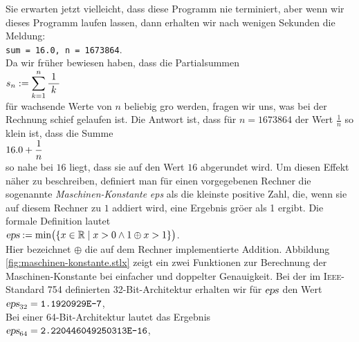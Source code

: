 Sie erwarten jetzt vielleicht, dass diese Programm nie terminiert, aber wenn wir dieses Programm
laufen lassen, dann erhalten wir nach wenigen Sekunden die Meldung:
\\[0.2cm]
\hspace*{1.3cm}
\texttt{sum = 16.0, n = 1673864}.
\\[0.2cm]
Da wir fr\"uher bewiesen haben, dass die Partialsummen
\\[0.2cm]
\hspace*{1.3cm}
$\displaystyle s_n := \sum\limits_{k=1}^n \displaystyle\frac{\;\displaystyle1\;}{\;\displaystyle k\;}$ 
\\[0.2cm]
f\"ur wachsende Werte von $n$ beliebig gro\3 werden, fragen wir uns, was bei der Rechnung schief gelaufen ist.
Die Antwort ist, dass f\"ur $n = 1673864$ der Wert $\frac{1}{n}$ so klein ist, dass die Summe
\\[0.2cm]
\hspace*{1.3cm}
$\displaystyle 16.0 + \frac{1}{n}$
\\[0.2cm]
so nahe bei $16$ liegt, dass sie auf den Wert $16$ abgerundet wird.  Um diesen Effekt n\"aher
zu beschreiben, definiert man f\"ur einen vorgegebenen Rechner die sogenannte
\emph{Maschinen-Konstante} \textsl{eps} als die kleinste positive Zahl, die, wenn sie auf diesem Rechner zu
$1$ addiert wird, eine Ergebnis gr\"o\3er als 1 ergibt.  Die formale Definition lautet
\\[0.2cm]
\hspace*{1.3cm}
$\textsl{eps} := \min\bigl( \{ x \in \mathbb{R} \mid x > 0 \wedge 1 \oplus x > 1 \} \bigr)$.
\\[0.2cm]
Hier bezeichnet $\oplus$ die auf dem Rechner implementierte Addition.
Abbildung \ref{fig:maschinen-konstante.stlx} zeigt ein zwei Funktionen zur Berechnung der
Maschinen-Konstante bei einfacher und doppelter Genauigkeit.  Bei der im \textsc{Ieee}-Standard 754
definierten 32-Bit-Architektur erhalten wir f\"ur $\textsl{eps}$ den Wert
\\[0.2cm]
\hspace*{1.3cm}
$\textsl{eps}_{32} = \texttt{1.1920929E-7}$,
\\[0.2cm]
Bei einer 64-Bit-Architektur lautet das Ergebnis
\\[0.2cm]
\hspace*{1.3cm}
$\textsl{eps}_{64} = \texttt{2.220446049250313E-16}$,



